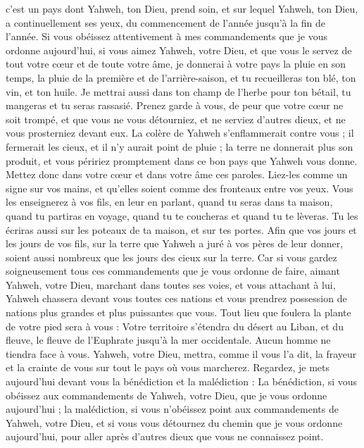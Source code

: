 \begin{multicols}{2}
c'est un pays dont Yahweh, ton Dieu, prend soin, et sur lequel Yahweh, ton Dieu, a continuellement ses yeux, du commencement de l'année jusqu'à la fin de l’année.
Si vous obéissez attentivement à mes commandements que je vous ordonne aujourd'hui, si vous aimez Yahweh, votre Dieu, et que vous le servez de tout votre cœur et de toute votre âme,
je donnerai à votre pays la pluie en son temps, la pluie de la première et de l’arrière-saison, et tu recueilleras ton blé, ton vin, et ton huile.
Je mettrai aussi dans ton champ de l'herbe pour ton bétail, tu mangeras et tu seras rassasié.
Prenez garde à vous, de peur que votre cœur ne soit trompé, et que vous ne vous détourniez, et ne serviez d'autres dieux, et ne vous prosterniez devant eux.
La colère de Yahweh s'enflammerait contre vous ; il fermerait les cieux, et il n'y aurait point de pluie ; la terre ne donnerait plus son produit, et vous péririez promptement dans ce bon pays que Yahweh vous donne.
Mettez donc dans votre cœur et dans votre âme ces paroles. Liez-les comme un signe sur vos mains, et qu’elles soient comme des fronteaux entre vos yeux.
Vous les enseignerez à vos fils, en leur en parlant, quand tu seras dans ta maison, quand tu partiras en voyage, quand tu te coucheras et quand tu te lèveras.
Tu les écriras aussi sur les poteaux de ta maison, et sur tes portes.
Afin que vos jours et les jours de vos fils, sur la terre que Yahweh a juré à vos pères de leur donner, soient aussi nombreux que les jours des cieux sur la terre.
Car si vous gardez soigneusement tous ces commandements que je vous ordonne de faire, aimant Yahweh, votre Dieu, marchant dans toutes ses voies, et vous attachant à lui,
Yahweh chassera devant vous toutes ces nations et vous prendrez possession de nations plus grandes et plus puissantes que vous.
Tout lieu que foulera la plante de votre pied sera à vous : Votre territoire s’étendra du désert au Liban, et du fleuve, le fleuve de l’Euphrate jusqu'à la mer occidentale.
Aucun homme ne tiendra face à vous. Yahweh, votre Dieu, mettra, comme il vous l’a dit, la frayeur et la crainte de vous sur tout le pays où vous marcherez.
Regardez, je mets aujourd'hui devant vous la bénédiction et la malédiction :
La bénédiction, si vous obéissez aux commandements de Yahweh, votre Dieu, que je vous ordonne aujourd'hui ;
la malédiction, si vous n'obéissez point aux commandements de Yahweh, votre Dieu, et si vous vous détournez du chemin que je vous ordonne aujourd'hui, pour aller après d'autres dieux que vous ne connaissez point.

\end{multicols}
